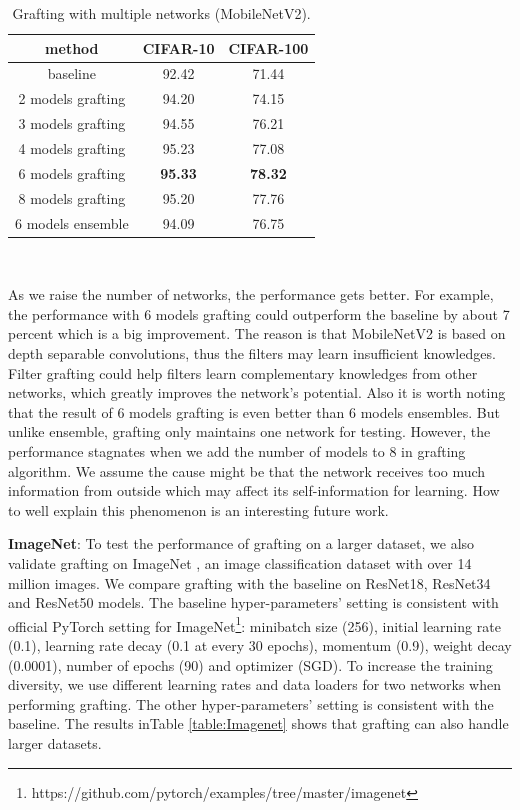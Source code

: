 \documentclass{article}
\begin{document}
\begin{table}[!h]
	\caption{Grafting with multiple networks (MobileNetV2). }
	\begin{center}
		\begin{tabular}{|c|c|c|} 
			\hline 
			method&CIFAR-10 &CIFAR-100\\ 
			\hline
			baseline& 92.42 & 71.44 \\
			\hline
			2 models grafting&94.20&74.15\\
			3 models grafting&94.55&76.21\\
			4 models grafting&95.23&77.08\\
			6 models grafting&\textbf{95.33}&\textbf{78.32}\\
			8 models grafting&95.20&77.76\\
			\hline
			6 models ensemble&94.09&76.75\\
			\hline
		\end{tabular}\\
	\end{center}
	\label{table:4_4}
\end{table}

As we raise the number of networks, the performance gets better. For example, the performance with 6 models grafting could outperform the baseline by about 7 percent which is a big improvement. The reason is that MobileNetV2 is based on depth separable convolutions, thus the filters may learn insufficient
knowledges. Filter grafting could help filters learn complementary knowledges from other networks, which greatly improves the network's potential. Also it is worth noting that the result of 6 models grafting is even better than 6 models ensembles. But unlike ensemble, grafting only maintains one network for testing. However, the performance stagnates when we add the number of models to 8 in grafting algorithm. We assume the cause might be that the network receives too much information from outside which may affect its self-information for learning. How to well explain this phenomenon is an interesting future work.

\textbf{ImageNet}: To test the performance of grafting on a larger dataset, we also validate grafting on ImageNet \cite{deng2009imagenet}, an image classification dataset with over 14 million images. We compare grafting with the baseline on ResNet18, ResNet34 and ResNet50 models. The baseline hyper-parameters' setting is consistent with official PyTorch setting for ImageNet\footnote{https://github.com/pytorch/examples/tree/master/imagenet}: minibatch size (256), initial learning rate (0.1), learning rate decay (0.1 at every 30 epochs), momentum (0.9), weight decay (0.0001), number of epochs (90) and optimizer (SGD). To increase the training diversity, we use different learning rates and data loaders for two networks when performing grafting. The other hyper-parameters' setting is consistent with the baseline. The results inTable \ref{table:Imagenet} shows that grafting  can also handle larger datasets.
\end{document}
